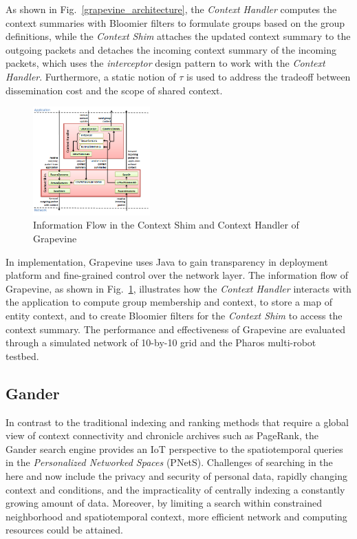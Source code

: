 \documentclass[11pt,onecolumn]{article}
\begin{document}
As shown in Fig.~\ref{grapevine_architecture}, the {\em Context Handler} computes the context summaries with Bloomier filters to formulate groups based on the group definitions, while the {\em Context Shim} attaches the updated context summary to the outgoing packets and detaches the incoming context summary of the incoming packets, which uses the {\em interceptor} design pattern to work with the {\em Context Handler}. Furthermore, a static notion of $\tau$ is used to address the tradeoff between dissemination cost and the scope of shared context.

\begin{figure}
  \begin{center}
    \includegraphics[width=0.4\textwidth]{resources/grapevine_implementation.png}
  \end{center}
  \vspace{-20pt}
  \caption{Information Flow in the Context Shim and Context Handler of Grapevine \cite{grapevine} \label{grapevine_flow}}
    \vspace{-20pt}
\end{figure}

In implementation, Grapevine uses Java to gain transparency in deployment platform and fine-grained control over the network layer. The information flow of Grapevine, as shown in Fig.~\ref{grapevine_flow}, illustrates how the {\em Context Handler} interacts with the application to compute group membership and context, to store a map of entity context, and to create Bloomier filters for the {\em Context Shim} to access the context summary. The performance and effectiveness of Grapevine are evaluated through a simulated network of 10-by-10 grid and the Pharos multi-robot testbed\cite{agmon2008multi}.


\subsection{Gander}
In contrast to the traditional indexing and ranking methods that require a global view of context connectivity and chronicle archives such as PageRank\cite{page1999pagerank}, the Gander search engine \cite{michel2013gander} provides an IoT perspective to the spatiotemporal queries in the {\em Personalized Networked Spaces} (PNetS). Challenges of searching in the here and now include the privacy and security of personal data, rapidly changing context and conditions, and the impracticality of centrally indexing a constantly growing amount of data. Moreover, by limiting a search within constrained neighborhood and spatiotemporal context, more efficient network and computing resources could be attained.
\end{document}
